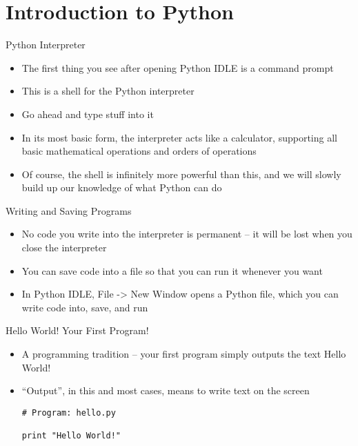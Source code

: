\section{Introduction to Python}
\begin{frame}{Python Interpreter}
\begin{itemize}
\item The first thing you see after opening Python IDLE is a command prompt
\item This is a shell for the Python interpreter
\item Go ahead and type stuff into it
\item In its most basic form, the interpreter acts like a calculator, supporting all basic mathematical operations and orders of operations
\item Of course, the shell is infinitely more powerful than this, and we will slowly build up our knowledge of what Python can do
\end{itemize}
\end{frame}

\begin{frame}{Writing and Saving Programs}
\begin{itemize}
\item No code you write into the interpreter is permanent -- it will be lost when you close the interpreter
\item You can save code into a file so that you can run it whenever you want
\item In Python IDLE, File -> New Window opens a Python file, which you can write code into, save, and run
\end{itemize}
\end{frame}

\begin{frame}[fragile]{Hello World! Your First Program!}
\begin{itemize}
\item A programming tradition -- your first program simply outputs the text {\ttfamily Hello World!}
\item ``Output'', in this and most cases, means to write text on the screen
\begin{lstlisting}
# Program: hello.py

print "Hello World!"
\end{lstlisting}
\end{itemize}
\end{frame}


